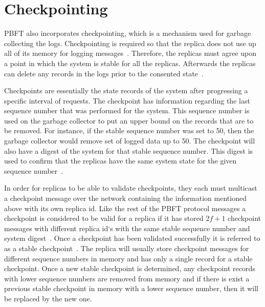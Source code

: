 \section{Checkpointing}
\label{sec:checkpoint}
PBFT also incorporates checkpointing, which is a mechanism used for garbage collecting the logs. Checkpointing is required so that the replica does not use up all of its memory for logging messages~\cite[p.~261]{BOOK:BuildDepDistSyst}. Therefore, the replicas must agree upon a point in which the system is stable for all the replicas. Afterwards the replicas can delete any records in the logs prior to the consented state~\cites[p.~5]{PAPER:OGPBFT}[p.~410]{PAPER:PBFTRecovery}. 

Checkpoints are essentially the state records of the system after progressing a specific interval of requests. The checkpoint has information regarding the last sequence number that was performed for the system. This sequence number is used on the garbage collector to put an upper bound on the records that are to be removed. For instance, if the stable sequence number was set to 50, then the garbage collector would remove set of logged data up to 50. The checkpoint will also have a digest of the system for that stable sequence number. This digest is used to confirm that the replicas have the same system state for the given sequence number~\cites[p.~5]{PAPER:OGPBFT}[p.~410]{PAPER:PBFTRecovery}. 

In order for replicas to be able to validate checkpoints, they each must multicast a checkpoint message over the network containing the information mentioned above with its own replica id. Like the rest of the PBFT protocol messages a checkpoint is considered to be valid for a replica if it has stored $2f+1$ checkpoint messages with different replica id`s with the same stable sequence number and system digest~\cites[p.~261-262]{BOOK:BuildDepDistSyst}[p.~5]{PAPER:OGPBFT}[p.~410]{PAPER:PBFTRecovery}. Once a checkpoint has been validated successfully it is referred to as a stable checkpoint~\cites[p.~3]{PAPER:DPBFT}[p.~261]{BOOK:BuildDepDistSyst}. The replica will usually store checkpoint messages for different sequence numbers in memory and has only a single record for a stable checkpoint. Once a new stable checkpoint is determined, any checkpoint records with lower sequence numbers are removed from memory and if there is exist a previous stable checkpoint in memory with a lower sequence number, then it will be replaced by the new one.%

